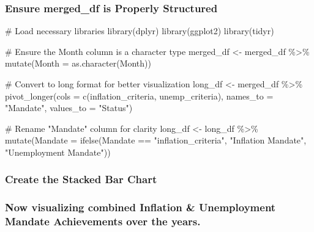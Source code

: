 \documentclass[
  letterpaper,
  DIV=11,
  numbers=noendperiod]{scrartcl}
\newenvironment{Shaded}{\begin{snugshade}}{\end{snugshade}}
\newcommand{\AttributeTok}[1]{\textcolor[rgb]{0.40,0.45,0.13}{#1}}
\newcommand{\CommentTok}[1]{\textcolor[rgb]{0.37,0.37,0.37}{#1}}
\newcommand{\FunctionTok}[1]{\textcolor[rgb]{0.28,0.35,0.67}{#1}}
\newcommand{\NormalTok}[1]{\textcolor[rgb]{0.00,0.23,0.31}{#1}}
\newcommand{\OtherTok}[1]{\textcolor[rgb]{0.00,0.23,0.31}{#1}}
\newcommand{\SpecialCharTok}[1]{\textcolor[rgb]{0.37,0.37,0.37}{#1}}
\newcommand{\StringTok}[1]{\textcolor[rgb]{0.13,0.47,0.30}{#1}}
\begin{document}
\subsubsection{Ensure merged\_df is Properly
Structured}\label{ensure-merged_df-is-properly-structured}

\begin{Shaded}
\begin{Highlighting}[]
\CommentTok{\# Load necessary libraries}
\FunctionTok{library}\NormalTok{(dplyr)}
\FunctionTok{library}\NormalTok{(ggplot2)}
\FunctionTok{library}\NormalTok{(tidyr)}

\CommentTok{\# Ensure the Month column is a character type}
\NormalTok{merged\_df }\OtherTok{\textless{}{-}}\NormalTok{ merged\_df }\SpecialCharTok{\%\textgreater{}\%}
  \FunctionTok{mutate}\NormalTok{(}\AttributeTok{Month =} \FunctionTok{as.character}\NormalTok{(Month))}

\CommentTok{\# Convert to long format for better visualization}
\NormalTok{long\_df }\OtherTok{\textless{}{-}}\NormalTok{ merged\_df }\SpecialCharTok{\%\textgreater{}\%}
  \FunctionTok{pivot\_longer}\NormalTok{(}\AttributeTok{cols =} \FunctionTok{c}\NormalTok{(inflation\_criteria, unemp\_criteria),}
               \AttributeTok{names\_to =} \StringTok{"Mandate"}\NormalTok{,}
               \AttributeTok{values\_to =} \StringTok{"Status"}\NormalTok{)}

\CommentTok{\# Rename "Mandate" column for clarity}
\NormalTok{long\_df }\OtherTok{\textless{}{-}}\NormalTok{ long\_df }\SpecialCharTok{\%\textgreater{}\%}
  \FunctionTok{mutate}\NormalTok{(}\AttributeTok{Mandate =} \FunctionTok{ifelse}\NormalTok{(Mandate }\SpecialCharTok{==} \StringTok{"inflation\_criteria"}\NormalTok{, }\StringTok{"Inflation Mandate"}\NormalTok{, }\StringTok{"Unemployment Mandate"}\NormalTok{))}
\end{Highlighting}
\end{Shaded}

\subsubsection{Create the Stacked Bar
Chart}\label{create-the-stacked-bar-chart}

\subsubsection{Now visualizing combined Inflation \& Unemployment
Mandate Achievements over the
years.}\label{now-visualizing-combined-inflation-unemployment-mandate-achievements-over-the-years.}
\end{document}

